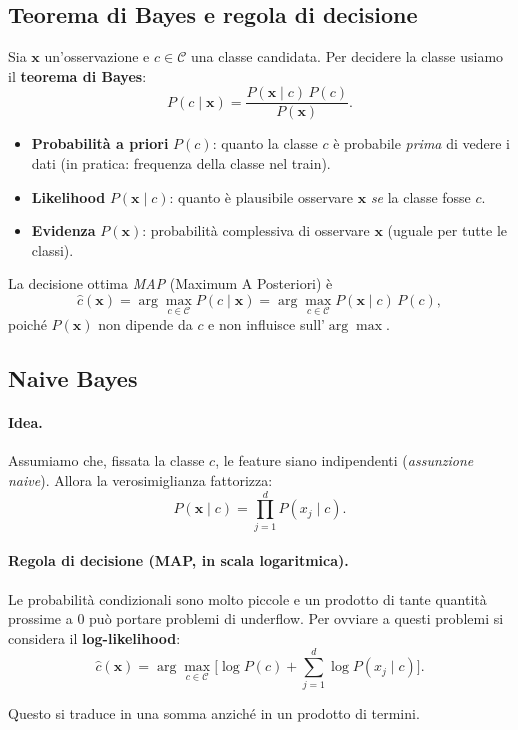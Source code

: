 \subsection{Teorema di Bayes e regola di decisione}\label{subsec:bayes-rule}
Sia $\mathbf{x}$ un’osservazione e $c\in\mathcal{C}$ una classe candidata. Per decidere la
classe usiamo il \textbf{teorema di Bayes}:
\[
P(c\mid \mathbf{x})=\frac{P(\mathbf{x}\mid c)\,P(c)}{P(\mathbf{x})}.
\]
\begin{itemize}
  \item \textbf{Probabilità a priori} $P(c)$: quanto la classe $c$ è probabile \emph{prima} di vedere i dati (in pratica: frequenza della classe nel train).
  \item \textbf{Likelihood} $P(\mathbf{x}\mid c)$: quanto è plausibile osservare $\mathbf{x}$ \emph{se} la classe fosse $c$.
  \item \textbf{Evidenza} $P(\mathbf{x})$: probabilità complessiva di osservare $\mathbf{x}$ (uguale per tutte le classi).
\end{itemize}
La decisione ottima \emph{MAP} (Maximum A Posteriori) è
\[
\hat{c}(\mathbf{x})=\arg\max_{c\in\mathcal{C}} P(c\mid \mathbf{x})
=\arg\max_{c\in\mathcal{C}} P(\mathbf{x}\mid c)\,P(c),
\]
poiché $P(\mathbf{x})$ non dipende da $c$ e non influisce sull’$\arg\max$.
\subsection{Naive Bayes}\label{subsec:naive-bayes}
\paragraph{Idea.}
Assumiamo che, fissata la classe \(c\), le feature siano indipendenti (\emph{assunzione naive}). Allora la verosimiglianza fattorizza:
\[
P(\mathbf{x}\mid c)=\prod_{j=1}^{d} P(x_j\mid c).
\]

\paragraph{Regola di decisione (MAP, in scala logaritmica).} Le probabilità condizionali sono molto piccole e un prodotto di tante quantità prossime a 0 può portare problemi di underflow. Per ovviare a questi problemi si considera il \textbf{log-likelihood}:
\[
\hat{c}(\mathbf{x})=\arg\max_{c\in\mathcal{C}}
\Big[\log P(c)+\sum_{j=1}^{d}\log P(x_j\mid c)\Big].
\]

\noindent
Questo si traduce in una somma anziché in un prodotto di termini.

